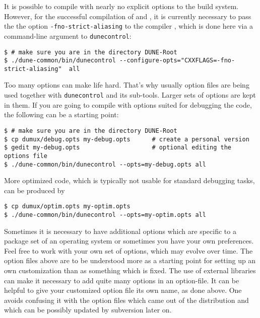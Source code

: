 It is possible to compile \Dumux with nearly no explicit options to the build system.
However, for the successful compilation of \Dune and \Dumux, it is currently necessary to pass the
the option \texttt{-fno-strict-aliasing} to the \Cplusplus compiler
\cite{WIKIPED-ALIASING}, which is done here via a command-line argument to \texttt{dunecontrol}:
\begin{lstlisting}[style=Bash]
$ # make sure you are in the directory DUNE-Root
$ ./dune-common/bin/dunecontrol --configure-opts="CXXFLAGS=-fno-strict-aliasing"  all
\end{lstlisting}

Too many options can make life hard. That's why usually option files are being used together with \texttt{dunecontrol} and its sub-tools.
Larger sets of options are kept in them. If you are going to compile with options suited for debugging the code, the following
can be a starting point:
\begin{lstlisting}[style=Bash]
$ # make sure you are in the directory DUNE-Root
$ cp dumux/debug.opts my-debug.opts      # create a personal version
$ gedit my-debug.opts                    # optional editing the options file 
$ ./dune-common/bin/dunecontrol --opts=my-debug.opts all 
\end{lstlisting}

More optimized code, which is typically not usable for standard debugging tasks, can be produced by 
\begin{lstlisting}[style=Bash]
$ cp dumux/optim.opts my-optim.opts 
$ ./dune-common/bin/dunecontrol --opts=my-optim.opts all
\end{lstlisting}

Sometimes it is necessary to have additional options which
are specific to a package set of an operating system or
sometimes you have your own preferences.
Feel free to work with your own set of options, which may evolve over time.
The option files above are to be understood more as a starting point
for setting up an own customization than as something which is fixed.
The use of external libraries can make it necessary to add quite many options in an option-file.
It can be helpful to give your customized option file its own name, as done above.
One avoids confusing it with the option files which came out of the distribution
and which can be possibly updated by subversion later on.

